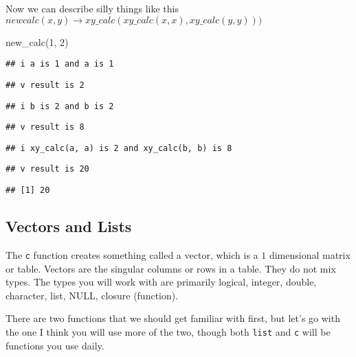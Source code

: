 \documentclass[
]{book}
\newenvironment{Shaded}{\begin{snugshade}}{\end{snugshade}}
\newcommand{\DecValTok}[1]{\textcolor[rgb]{0.00,0.00,0.81}{#1}}
\newcommand{\FunctionTok}[1]{\textcolor[rgb]{0.00,0.00,0.00}{#1}}
\newcommand{\NormalTok}[1]{#1}
\begin{document}
Now we can describe silly things like this \(newcalc(x, y) \rightarrow xy\_calc(xy\_calc(x, x), xy\_calc(y,y)))\)

\begin{Shaded}
\begin{Highlighting}[]
\FunctionTok{new\_calc}\NormalTok{(}\DecValTok{1}\NormalTok{, }\DecValTok{2}\NormalTok{)}
\end{Highlighting}
\end{Shaded}

\begin{verbatim}
## i a is 1 and a is 1
\end{verbatim}

\begin{verbatim}
## v result is 2
\end{verbatim}

\begin{verbatim}
## i b is 2 and b is 2
\end{verbatim}

\begin{verbatim}
## v result is 8
\end{verbatim}

\begin{verbatim}
## i xy_calc(a, a) is 2 and xy_calc(b, b) is 8
\end{verbatim}

\begin{verbatim}
## v result is 20
\end{verbatim}

\begin{verbatim}
## [1] 20
\end{verbatim}

\hypertarget{vectors-and-lists}{%
\subsection{Vectors and Lists}\label{vectors-and-lists}}

The \texttt{c} function creates something called a vector, which is a \(1\) dimensional matrix or table. Vectors are the singular columns or rows in a table. They do not mix types. The types you will work with are primarily logical, integer, double, character, list, NULL, closure (function).

There are two functions that we should get familiar with first, but let's go with the one I think you will use more of the two, though both \texttt{list} and \texttt{c} will be functions you use daily.
\end{document}
